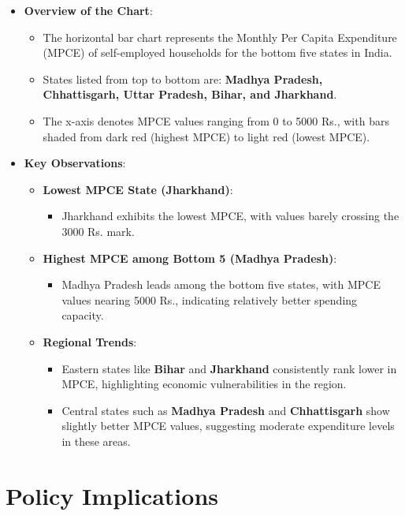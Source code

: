 \documentclass{article}
\begin{document}
\begin{itemize}
	\item \textbf{Overview of the Chart}:
	\begin{itemize}
		\item The horizontal bar chart represents the Monthly Per Capita Expenditure (MPCE) of self-employed households for the bottom five states in India.
		\item States listed from top to bottom are: \textbf{Madhya Pradesh, Chhattisgarh, Uttar Pradesh, Bihar, and Jharkhand}.
		\item The x-axis denotes MPCE values ranging from 0 to 5000 Rs., with bars shaded from dark red (highest MPCE) to light red (lowest MPCE).
	\end{itemize}
	\item \textbf{Key Observations}:
	\begin{itemize}
		\item \textbf{Lowest MPCE State (Jharkhand)}:
		\begin{itemize}
			\item Jharkhand exhibits the lowest MPCE, with values barely crossing the 3000 Rs. mark.
		\end{itemize}
		\item \textbf{Highest MPCE among Bottom 5 (Madhya Pradesh)}:
		\begin{itemize}
			\item Madhya Pradesh leads among the bottom five states, with MPCE values nearing 5000 Rs., indicating relatively better spending capacity.
		\end{itemize}
		\item \textbf{Regional Trends}:
		\begin{itemize}
			\item Eastern states like \textbf{Bihar} and \textbf{Jharkhand} consistently rank lower in MPCE, highlighting economic vulnerabilities in the region.
			\item Central states such as \textbf{Madhya Pradesh} and \textbf{Chhattisgarh} show slightly better MPCE values, suggesting moderate expenditure levels in these areas.
		\end{itemize}
	\end{itemize}
\end{itemize}

\section*{Policy Implications}
\end{document}
